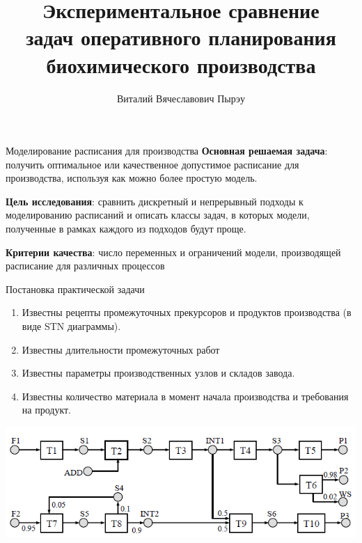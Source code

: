 \documentclass{beamer}
\title[\hbox to 56mm{Задачи планирования}]{	Экспериментальное сравнение \\ задач оперативного планирования биохимического производства}
\author[В.\,В. Пырэу]{Виталий Вячеславович Пырэу}
\institute{Московский физико-технический институт}
\date{\footnotesize
\par\smallskip\emph{Курс:} Автоматизация научных исследований\par (практика, В.\,В.~Стрижов)/Группа Б05-821
\par\smallskip\emph{Эксперт:} С.\,А.~Тренин
\par\bigskip\small 2021}
\begin{document}
\begin{frame}
\thispagestyle{empty}
\maketitle
\end{frame}

\begin{frame}{Моделирование расписания для производства}
\textbf{Основная решаемая задача}: получить оптимальное или качественное допустимое расписание для производства, используя как можно более простую модель.

\bigskip

\textbf{Цель исследования}: сравнить дискретный и непрерывный подходы к моделированию расписаний и описать классы задач, в которых модели, полученные в рамках каждого из подходов будут проще.

\bigskip

\textbf{Критерии качества}: число переменных и ограничений модели, производящей расписание для различных процессов
\end{frame}

\begin{frame}{Постановка практической задачи}
\begin{enumerate}
	\item Известны рецепты промежуточных прекурсоров и продуктов производства (в виде STN диаграммы).
	\item Известны длительности промежуточных работ
	\item Известны параметры производственных узлов и складов завода.
	\item Известны количество материала в момент начала производства и требования на продукт.
\end{enumerate}
\begin{center}
\includegraphics[width=1.0\textwidth]{stagedstn}
\end{center}
\end{frame}
\end{document}
